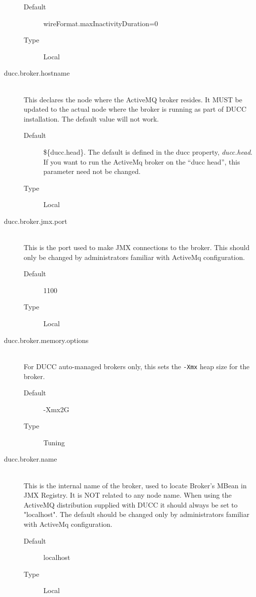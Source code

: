 \begin{description}
         \begin{description}
           \item[Default] wireFormat.maxInactivityDuration=0 
           \item[Type] Local 
         \end{description}

       \item[ducc.broker.hostname] \hfill \\
         This declares the node where the ActiveMQ broker resides. It MUST be updated to 
         the actual node where the broker is running as part of DUCC installation. The default value 
         will not work.          
         \begin{description}               
           \item[Default] \$\{ducc.head\}.  The default is defined in the ducc property, {\em ducc.head}.
             If you want to run the ActiveMq broker on the ``ducc head'', this parameter need not
             be changed.
           \item[Type] Local 
         \end{description}

       \item[ducc.broker.jmx.port] \hfill \\
         This is the port used to make JMX connections to the broker.  This should only
         be changed by administrators familiar with ActiveMq configuration.         
         \begin{description}         
           \item[Default] 1100                      
           \item[Type] Local 
         \end{description}

       \item[ducc.broker.memory.options] \hfill \\
         For DUCC auto-managed brokers only, this sets the {\tt -Xmx} heap size for the broker.
         \begin{description}
           \item[Default] -Xmx2G
           \item[Type] Tuning
         \end{description} 
           

       \item[ducc.broker.name] \hfill \\
         This is the internal name of the broker, used to locate Broker's MBean in JMX Registry. 
         It is NOT related to any node name. When using the ActiveMQ distribution supplied with 
         DUCC it should always be set to "localhost".  The default should be changed only by
         administrators familiar with ActiveMq configuration.
         \begin{description}
           \item[Default] localhost 
           \item[Type] Local              
         \end{description}



\end{description}

